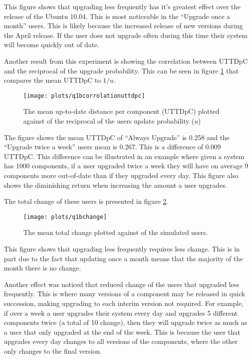 This figure shows that upgrading less frequently has it's greatest effect over the release of the Ubuntu 10.04.
This is most noticeable in the ``Upgrade once a month'' users.
This is likely because the increased release of new versions during the April release.
If the user does not upgrade often during this time their system will become quickly out of date.

Another result from this experiment is showing the correlation between UTTDpC and the reciprocal of the upgrade probability.
This can be seen in figure \ref{exp.q1bcorrolationuttdpc} that compares the mean UTTDpC to $1/u$.

\begin{figure}[htp]
\begin{center}
  \texttt{[image: plots/q1bcorrolationuttdpc]}
  \caption{The mean up-to-date distance per component (UTTDpC) plotted against of the reciprocal of the users update probability ($u$)}
  \label{exp.q1bcorrolationuttdpc}
\end{center}
\end{figure}

The figure shows the mean UTTDpC of ``Always Upgrade'' is 0.258 and the ``Upgrade twice a week'' users mean is 0.267.
This is a difference of 0.009 UTTDpC.
This difference can be illustrated in an example where given a system has 1000 components, 
if a user upgraded twice a week they will have on average 9 components more out-of-date than if they upgraded every day. 
This figure also shows the diminishing return when increasing the amount a user upgrades.

The total change of these users is presented in figure \ref{exp.q1bchange}.

\begin{figure}[htp]
\begin{center}
  \texttt{[image: plots/q1bchange]}
  \caption{The mean total change plotted against of the simulated users.}
  \label{exp.q1bchange}
\end{center}
\end{figure}

This figure shows that upgrading less frequently requires less change. 
This is in part due to the fact that updating once a month means that the majority of the month there is no change.

Another effect was noticed that reduced change of the users that upgraded less frequently.
This is where many versions of a component may be released in quick succession, making upgrading to each interim version not required.
For example, if over a week a user upgrades their system every day and upgrades 5 different components twice (a total of 10 change), 
then they will upgrade twice as much as a user that only upgraded at the end of the week.
This is because the user that upgrades every day changes to all versions of the components, where the other only changes to the final version.

